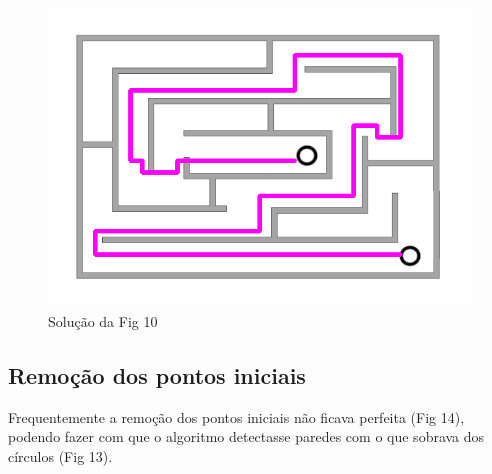 \documentclass[conference]{IEEEtran}
\begin{document}
        \begin{figure}[h!]
          \centering
            \includegraphics[scale=0.3]{solutionlab2.png}
            \caption{Solução da Fig 10}
        \end{figure}
    \subsection{Remoção dos pontos iniciais}
    Frequentemente a remoção dos pontos iniciais não ficava perfeita (Fig 14), podendo fazer com que o algoritmo detectasse paredes com o que sobrava dos círculos (Fig 13).
\end{document}
